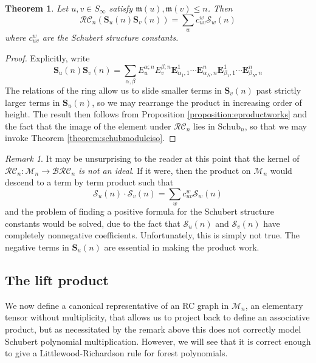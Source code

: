 \documentclass[a4paper,fleqn]{cas-sc}
\newtheorem{theorem}{Theorem}[section]
\theoremstyle{definition}
\theoremstyle{remark}
\newtheorem*{remark}{Remark}
\numberwithin{equation}{subsection}
\newcommand{\BRC}{\mathcal{BRC}}
\newcommand{\RC}{\mathcal{RC}}
\newcommand{\maxd}{\mathfrak{m}}
\begin{document}
\begin{theorem} \label{theorem:schubproduct}
Let $u,v\in S_\infty$ satisfy $\maxd(u),\maxd(v)\leq n$. Then
$$\RC_n(\mathbf{S}_u(n)\mathbf{S}_v(n)) = \sum_{w} c_{uv}^w \mathcal{S}_w(n)$$
where $c_{uv}^w$ are the Schubert structure constants.
\end{theorem}
\begin{proof}
  Explicitly, write
  $$\mathbf{S}_u(n)\mathbf{S}_v(n) = \sum_{\alpha,\beta} E_u^{\alpha;n}E_v^{\beta;n} \mathbf{E}_{\alpha_1,1}^1 \cdots  \mathbf{E}_{\alpha_N,n}^n \mathbf{E}_{\beta_1,1}^1 \cdots  \mathbf{E}_{\beta_N,n}^n$$
  The relations of the ring allow us to slide smaller terms in $\mathbf{S}_v(n)$ past strictly larger terms in $\mathbf{S}_u(n)$, so we may rearrange the product in increasing order of height. The result then follows from Proposition \ref{proposition:eproductworks} and the fact that the image of the element under $\RC_n$ lies in $\mathrm{Schub}_n$, so that we may invoke Theorem \ref{theorem:schubmoduleiso}.
\end{proof}

\begin{remark}
It may be unsurprising to the reader at this point that the kernel of $\RC_n:\mathcal{M}_n\to \BRC_n$ \emph{is not an ideal}. If it were, then the product on $\mathcal{M}_n$ would descend to a term by term product such that
$$\mathcal{S}_u(n)\cdot \mathcal{S}_v(n) = \sum_{w} c_{uv}^w \mathcal{S}_w(n)$$
and the problem of finding a positive formula for the Schubert structure constants would be solved, due to the fact that $\mathcal{S}_u(n)$ and $\mathcal{S}_v(n)$ have completely nonnegative coefficients. Unfortunately, this is simply not true. The negative terms in $\mathbf{S}_u(n)$ are essential in making the product work.
\end{remark}


\subsection{The lift product}\label{section:liftproduct}

We now define a canonical representative of an RC graph in $\mathcal{M}_n$, an elementary tensor without multiplicity, that allows us to project back to define an associative product, but as necessitated by the remark above this does not correctly model Schubert polynomial multiplication. However, we will see that it is correct enough to give a Littlewood-Richardson rule for forest polynomials.
\end{document}
